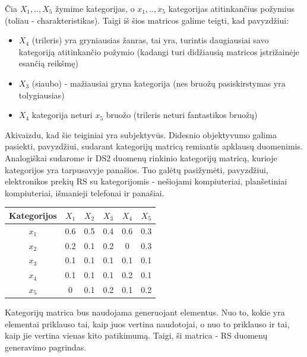 \documentclass{VUMIFInfMagistrinis}
\begin{document}
Čia $X_1, .., X_5$ žymime kategorijas, o $x_1, .., x_5$ kategorijas atitinkančius požymius (toliau - charakteristikas). Taigi iš šios matricos galime teigti, kad pavyzdžiui:
\begin{itemize}
	\item $X_4$ (trileris) yra gryniausias žanras, tai yra, turintis daugiausiai savo kategoriją atitinkančio požymio (kadangi turi didžiausią matricos įstrižainėje esančią reikšmę)
	\item $X_3$ (siaubo) - mažiausiai gryna kategorija (nes bruožų pasiskirstymas yra tolygiausias)
	\item $X_4$ kategorija neturi $x_5$ bruožo (trileris neturi fantastikos bruožų)
\end{itemize} 
Akivaizdu, kad šie teiginiai yra subjektyvūs. Didesnio objektyvumo galima pasiekti, pavyzdžiui, sudarant kategorijų matricą remiantis apklausų duomenimis.
\newline
\indent
Analogiškai sudarome ir DS2 duomenų rinkinio kategorijų matricą, kurioje kategorijos yra tarpusavyje panašios. Tuo galėtų pasižymėti, pavyzdžiui, elektronikos prekių RS su kategorijomis - nešiojami kompiuteriai, planšetiniai kompiuteriai, išmanieji telefonai ir panašiai.
\begin{center}
	\begin{tabular}{||c c c c c c||} 
		\hline
		Kategorijos & $X_1$ & $X_2$ & $X_3$ & $X_4$ & $X_5$ \\ [0.5ex] 
		\hline\hline
		$x_1$ & 0.6 & 0.5 & 0.4 & 0.6 & 0.3 \\ 
		\hline
		$x_2$ & 0.2 & 0.1 & 0.2 & 0 & 0.3 \\
		\hline
		$x_3$ & 0.1 & 0.1 & 0.1 & 0.1 & 0.1 \\
		\hline
		$x_4$ & 0.1 & 0.1 & 0.1 & 0.2 & 0.1 \\
		\hline
		$x_5$ & 0 & 0.1 & 0.2 & 0.1 & 0.2 \\ [1ex] 
		\hline
	\end{tabular}\label{SP2}
\end{center}
\indent
Kategorijų matrica bus naudojama generuojant elementus. Nuo to, kokie yra elementai priklauso tai, kaip juos vertina naudotojai, o nuo to priklauso ir tai, kaip jie vertina vienas kito patikimumą. Taigi, ši matrica - RS duomenų generavimo pagrindas.
\end{document}
